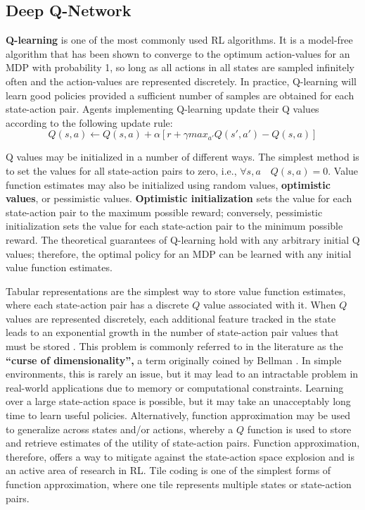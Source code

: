 \subsection{Deep Q-Network}
\textbf{Q-learning} \parencite{Watkins} is one of the most commonly used RL algorithms. It is a model-free algorithm that has been shown to converge to the optimum action-values for an MDP with probability 1, so long as all actions in all states are sampled infinitely often and the
action-values are represented discretely. In practice, Q-learning will
learn good policies provided a sufficient number of samples are obtained for each state-action
pair. Agents implementing Q-learning update their Q values according to the following update rule:
\begin{equation}
    Q(s,a) \leftarrow Q(s,a) + \alpha [ r + \gamma max_{a'} Q(s',a') - Q(s,a)]
\end{equation}

Q values may be initialized in a number of different ways. The simplest method is to set the values for all state-action pairs to zero, i.e., \( \forall s, a \quad Q(s, a) = 0 \). Value function estimates may also be initialized using random values, \textbf{optimistic values}, or pessimistic values. \textbf{Optimistic initialization} sets the value for each state-action pair to the maximum possible reward; conversely, pessimistic initialization sets the value for each state-action pair to the minimum possible reward. The theoretical guarantees of Q-learning hold with any arbitrary initial Q values; therefore, the optimal policy for an MDP can be learned with any initial value function estimates.


Tabular representations are the simplest way to store value function estimates, where each state-action pair has a discrete \( Q \) value associated with it. When \( Q \) values are represented discretely, each additional feature tracked in the state leads to an exponential growth in the number of state-action pair values that must be stored \cite{Sutton1998}. This problem is commonly referred to in the literature as the \textbf{“curse of dimensionality”,} a term originally coined by Bellman \parencite{Bellman1957}. In simple environments, this is rarely an issue, but it may lead to an intractable problem in real-world applications due to memory or computational constraints. Learning over a large state-action space is possible, but it may take an unacceptably long time to learn useful policies. Alternatively, function approximation may be used to generalize across states and/or actions, whereby a \( Q \) function is used to store and retrieve estimates of the utility of state-action pairs. Function approximation, therefore, offers a way to mitigate against the state-action space explosion and is an active area of research in RL. Tile coding is one of the simplest forms of function approximation, where one tile represents multiple states or state-action pairs.


